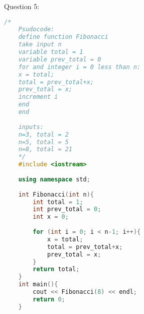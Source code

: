 \documentclass{article}
\begin{document}
\vspace{1cm}

Question 5:

\begin{lstlisting}[language=C++]
    /*
    Psudocode:
    define function Fibonacci
    take input n
    variable total = 1
    variable prev_total = 0
    for and integer i = 0 less than n:
    x = total;
    total = prev_total+x;
    prev_total = x;
    increment i
    end
    end
    
    inputs:
    n=3, total = 2
    n=5, total = 5
    n=8, total = 21
    */
    #include <iostream>
    
    using namespace std;
    
    int Fibonacci(int n){
        int total = 1;
        int prev_total = 0;
        int x = 0;
    
        for (int i = 0; i < n-1; i++){
            x = total;
            total = prev_total+x;
            prev_total = x;
        }
        return total;
    }
    int main(){
        cout << Fibonacci(8) << endl;
        return 0;
    }
\end{lstlisting}
\end{document}

